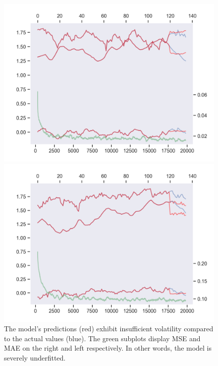 \documentclass{article}
\begin{document}
\begin{figure}[!tbp]
  \centering
  \begin{minipage}[b]{0.49\textwidth}
    \includegraphics[width=\textwidth]{paper/imgs/mse.png}
  \end{minipage}
  \hfill
  \begin{minipage}[b]{0.49\textwidth}
    \includegraphics[width=\textwidth]{paper/imgs/mae.png}
  \end{minipage}
  \caption{The model's predictions (red) exhibit insufficient volatility compared to the actual values (blue). The green subplots display MSE and MAE on the right and left respectively. In other words, the model is severely underfitted.}
  \label{fig:MSE & MAE}
\end{figure}
\end{document}
